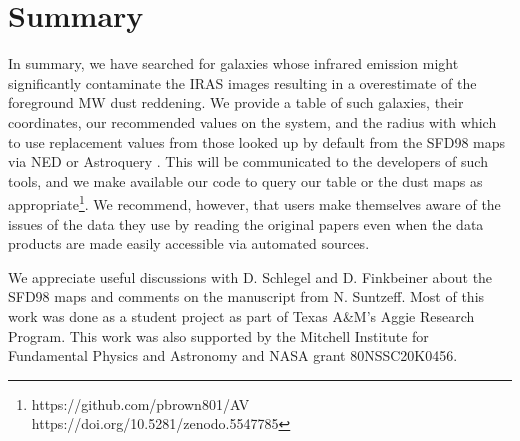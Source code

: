 \documentclass[twocolumn]{aastex63}
\begin{document}
\section{Summary\label{sec_summary}}

In summary, we have searched for galaxies whose infrared emission might significantly contaminate the IRAS images resulting in a overestimate of the foreground MW dust reddening.  We provide a table of such galaxies, their coordinates, our recommended values on the \citet{Schlafly_Finkbeiner_2011} system, and the radius with which to use replacement values from those looked up by default from the SFD98 maps via NED or Astroquery \citep{Ginsburg_etal_2019}.  This will be communicated to the developers of such tools, and we make available our code to query our table or the dust maps as appropriate\footnote{https://github.com/pbrown801/AV  https://doi.org/10.5281/zenodo.5547785}.  We recommend, however, that users make themselves aware of the issues of the data they use by reading the original papers even when the data products are made easily accessible via automated sources.

\acknowledgments
We appreciate useful discussions with D. Schlegel and D. Finkbeiner about the SFD98 maps and comments on the manuscript from N. Suntzeff.  Most of this work was done as a student project as part of Texas A\&M's Aggie Research Program.  This work was also supported by the Mitchell Institute for Fundamental Physics and Astronomy and NASA grant 80NSSC20K0456. 


\vspace{5cm}


\clearpage


{}

\clearpage
\begin{longrotatetable}

\end{longrotatetable}
\end{document}

